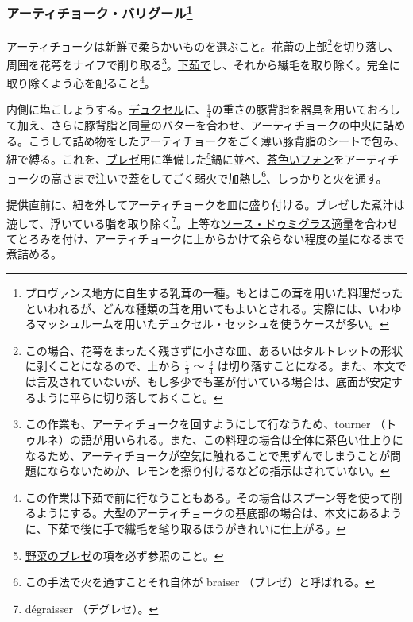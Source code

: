 \begin{recette}

\hypertarget{artichauts-a-la-barigoule}{%
\subsubsection[アーティチョーク・バリグール]{\texorpdfstring{アーティチョーク・バリグール\footnote{プロヴァンス地方に自生する乳茸の一種。もとはこの茸を用いた料理だったといわれるが、どんな種類の茸を用いてもよいとされる。実際には、いわゆるマッシュルームを用いたデュクセル・セッシュを使うケースが多い。}}{アーティチョーク・バリグール}}\label{artichauts-a-la-barigoule}}



アーティチョークは新鮮で柔らかいものを選ぶこと。花蕾の上部\footnote{この場合、花萼をまったく残さずに小さな皿、あるいはタルトレットの形状に剥くことになるので、上から
  \(\frac{1}{3}\) 〜 \(\frac{3}{4}\)
  は切り落すことになる。また、本文では言及されていないが、もし多少でも茎が付いている場合は、底面が安定するように平らに切り落しておくこと。}を切り落し、周囲を花萼をナイフで削り取る\footnote{この作業も、アーティチョークを回すようにして行なうため、tourner
  （トゥルネ）の語が用いられる。また、この料理の場合は全体に茶色い仕上りになるため、アーティチョークが空気に触れることで黒ずんでしまうことが問題にならないためか、レモンを擦り付けるなどの指示はされていない。}。\protect\hyperlink{blanchissage}{下茹で}し、それから繊毛を取り除く。完全に取り除くよう心を配ること\footnote{この作業は下茹で前に行なうこともある。その場合はスプーン等を使って削るようにする。大型のアーティチョークの基底部の場合は、本文にあるように、下茹で後に手で繊毛を毟り取るほうがきれいに仕上がる。}。

内側に塩こしょうする。\protect\hyperlink{duxelles-seche}{デュクセル}に、\(\frac{1}{4}\)の重さの豚背脂を器具を用いておろして加え、さらに豚背脂と同量のバターを合わせ、アーティチョークの中央に詰める。こうして詰め物をしたアーティチョークをごく薄い豚背脂のシートで包み、紐で縛る。これを、\protect\hyperlink{braisage-des-legumes}{ブレゼ}用に準備した\footnote{\protect\hyperlink{braisage-des-legumes}{野菜のブレゼ}の項を必ず参照のこと。}鍋に並べ、\protect\hyperlink{fonds-brun}{茶色いフォン}をアーティチョークの高さまで注いで蓋をしてごく弱火で加熱し\footnote{この手法で火を通すことそれ自体が
  braiser （ブレゼ）と呼ばれる。}、しっかりと火を通す。

提供直前に、紐を外してアーティチョークを皿に盛り付ける。ブレゼした煮汁は漉して、浮いている脂を取り除く\footnote{dégraisser
  （デグレセ）。}。上等な\protect\hyperlink{sauce-demi-glace}{ソース・ドゥミグラス}適量を合わせてとろみを付け、アーティチョークに上からかけて余らない程度の量になるまで煮詰める。


\end{recette}
